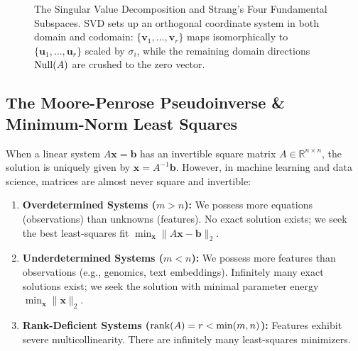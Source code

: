 \begin{figure}[htbp]
\caption{The Singular Value Decomposition and Strang's Four Fundamental Subspaces. SVD sets up an orthogonal coordinate system in both domain and codomain: $\{\mathbf{v}_1, \dots, \mathbf{v}_r\}$ maps isomorphically to $\{\mathbf{u}_1, \dots, \mathbf{u}_r\}$ scaled by $\sigma_i$, while the remaining domain directions $\operatorname{Null}(A)$ are crushed to the zero vector.}
\label{fig:four_subspaces_svd}
\end{figure}

\subsection{The Moore-Penrose Pseudoinverse \& Minimum-Norm Least Squares}
When a linear system $A\mathbf{x} = \mathbf{b}$ has an invertible square matrix $A \in \mathbb{R}^{n \times n}$, the solution is uniquely given by $\mathbf{x} = A^{-1}\mathbf{b}$. However, in machine learning and data science, matrices are almost never square and invertible:
\begin{enumerate}
    \item \textbf{Overdetermined Systems ($m > n$):} We possess more equations (observations) than unknowns (features). No exact solution exists; we seek the best least-squares fit $\min_{\mathbf{x}} \|A\mathbf{x} - \mathbf{b}\|_2$.
    \item \textbf{Underdetermined Systems ($m < n$):} We possess more features than observations (e.g., genomics, text embeddings). Infinitely many exact solutions exist; we seek the solution with minimal parameter energy $\min_{\mathbf{x}} \|\mathbf{x}\|_2$.
    \item \textbf{Rank-Deficient Systems ($\operatorname{rank}(A) = r < \min(m, n)$):} Features exhibit severe multicollinearity. There are infinitely many least-squares minimizers.
\end{enumerate}

